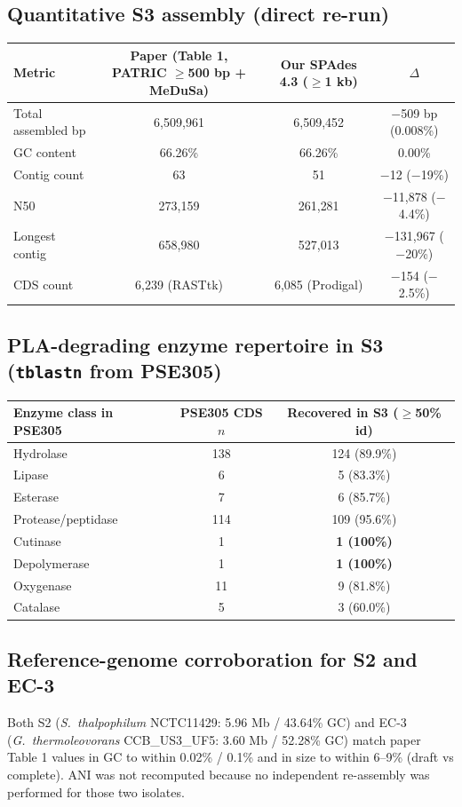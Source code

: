 \documentclass[11pt]{article}
\begin{document}
\subsection{Quantitative S3 assembly (direct re-run)}
\begin{tabular}{@{}lccc@{}}
\toprule
Metric & Paper (Table 1, PATRIC $\geq$500 bp + MeDuSa) & Our SPAdes 4.3 ($\geq$1 kb) & $\Delta$ \\
\midrule
Total assembled bp & 6{,}509{,}961 & 6{,}509{,}452 & $-$509 bp (0.008\%) \\
GC content         & 66.26\%       & 66.26\%       & 0.00\% \\
Contig count       & 63            & 51            & $-$12 ($-$19\%) \\
N50                & 273{,}159     & 261{,}281     & $-$11{,}878 ($-$4.4\%) \\
Longest contig     & 658{,}980     & 527{,}013     & $-$131{,}967 ($-$20\%) \\
CDS count          & 6{,}239 (RASTtk) & 6{,}085 (Prodigal) & $-$154 ($-$2.5\%) \\
\bottomrule
\end{tabular}

\subsection{PLA-degrading enzyme repertoire in S3 (\texttt{tblastn} from PSE305)}
\begin{tabular}{@{}lcc@{}}
\toprule
Enzyme class in PSE305 & PSE305 CDS $n$ & Recovered in S3 ($\geq$50\% id) \\
\midrule
Hydrolase           & 138 & 124 (89.9\%) \\
Lipase              &   6 &   5 (83.3\%) \\
Esterase            &   7 &   6 (85.7\%) \\
Protease/peptidase  & 114 & 109 (95.6\%) \\
Cutinase            &   1 & \textbf{1 (100\%)} \\
Depolymerase        &   1 & \textbf{1 (100\%)} \\
Oxygenase           &  11 &   9 (81.8\%) \\
Catalase            &   5 &   3 (60.0\%) \\
\bottomrule
\end{tabular}

\subsection{Reference-genome corroboration for S2 and EC-3}
Both S2 (\emph{S.\ thalpophilum} NCTC11429: 5.96 Mb / 43.64\% GC) and EC-3
(\emph{G.\ thermoleovorans} CCB\_US3\_UF5: 3.60 Mb / 52.28\% GC) match paper
Table 1 values in GC to within 0.02\% / 0.1\% and in size to within 6--9\%
(draft vs complete). ANI was not recomputed because no independent re-assembly
was performed for those two isolates.
\end{document}
